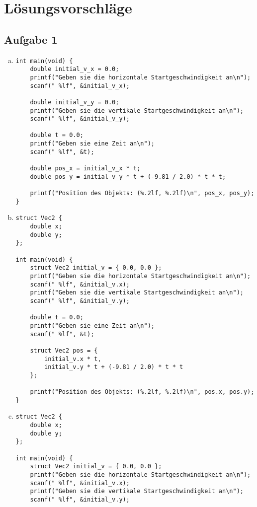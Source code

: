 \documentclass{standalone}
\begin{document}
\newpage
\section{Lösungsvorschläge}
\subsection{Aufgabe 1}
\begin{enumerate}[a)]
\item
    \begin{verbatim}
int main(void) {
    double initial_v_x = 0.0;
    printf("Geben sie die horizontale Startgeschwindigkeit an\n");
    scanf(" %lf", &initial_v_x);

    double initial_v_y = 0.0;
    printf("Geben sie die vertikale Startgeschwindigkeit an\n");
    scanf(" %lf", &initial_v_y);

    double t = 0.0;
    printf("Geben sie eine Zeit an\n");
    scanf(" %lf", &t);

    double pos_x = initial_v_x * t;
    double pos_y = initial_v_y * t + (-9.81 / 2.0) * t * t;

    printf("Position des Objekts: (%.2lf, %.2lf)\n", pos_x, pos_y);
}
    \end{verbatim}

\item
    \begin{verbatim}
struct Vec2 {
    double x;
    double y;
};

int main(void) {
    struct Vec2 initial_v = { 0.0, 0.0 };
    printf("Geben sie die horizontale Startgeschwindigkeit an\n");
    scanf(" %lf", &initial_v.x);
    printf("Geben sie die vertikale Startgeschwindigkeit an\n");
    scanf(" %lf", &initial_v.y);

    double t = 0.0;
    printf("Geben sie eine Zeit an\n");
    scanf(" %lf", &t);

    struct Vec2 pos = {
        initial_v.x * t,
        initial_v.y * t + (-9.81 / 2.0) * t * t
    };

    printf("Position des Objekts: (%.2lf, %.2lf)\n", pos.x, pos.y);
}
    \end{verbatim}

\item
    \begin{verbatim}
struct Vec2 {
    double x;
    double y;
};

int main(void) {
    struct Vec2 initial_v = { 0.0, 0.0 };
    printf("Geben sie die horizontale Startgeschwindigkeit an\n");
    scanf(" %lf", &initial_v.x);
    printf("Geben sie die vertikale Startgeschwindigkeit an\n");
    scanf(" %lf", &initial_v.y);


\end{verbatim}
\end{enumerate}
\end{document}
